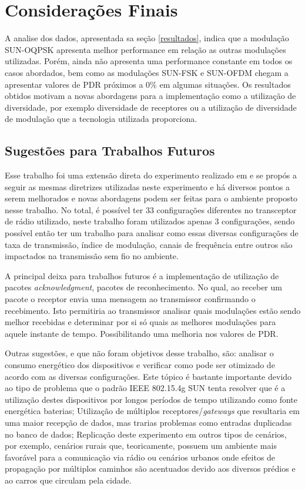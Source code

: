 \chapter{Considerações Finais}
\label{cap:conclusao}
A analise dos dados, apresentada sa seção \ref{resultados}, indica que a modulação SUN-OQPSK apresenta melhor performance em relação as outras modulações utilizadas. Porém, ainda não apresenta uma performance constante em todos os casos abordados, bem como as modulações SUN-FSK e SUN-OFDM chegam a apresentar valores de PDR próximos a 0\% em algumas situações. Os resultados obtidos motivam a novas abordagens para a implementação como a utilização de diversidade, por exemplo diversidade de receptores ou a utilização de diversidade de modulação que a tecnologia utilizada proporciona.


\section{Sugestões para Trabalhos Futuros}
\label{sec:futuros}
Esse trabalho foi uma extensão direta do experimento realizado em \cite{tuset2020dataset} e se propós a seguir as mesmas diretrizes utilizadas neste experimento e há diversos pontos a serem melhorados e novas abordagens podem ser feitas para o ambiente proposto nesse trabalho. No total, é possível ter 33 configurações diferentes no transceptor de rádio utilizado, neste trabalho foram utilizados apenas 3 configurações, sendo possível então ter um trabalho para analisar como essas diversas configurações de taxa de transmissão, índice de modulação, canais de frequência entre outros são impactados na transmissão sem fio no ambiente.

A principal deixa para trabalhos futuros é a implementação de utilização de pacotes \emph{acknowledgment}, pacotes de reconhecimento. No qual, ao receber um pacote o receptor envia uma mensagem ao transmissor confirmando o recebimento. Isto permitiria ao transmissor analisar quais modulações estão sendo melhor recebidas e determinar por si só quais as melhores modulações para aquele instante de tempo. Possibilitando uma melhoria nos valores de PDR.

Outras sugestões, e que não foram objetivos desse trabalho, são: analisar o consumo energético dos dispositivos e verificar como pode ser otimizado de acordo com as diversas configurações. Este tópico é bastante importante devido ao tipo de problema que o padrão IEEE 802.15.4g SUN tenta resolver que é a utilização destes dispositivos por longos períodos de tempo utilizando como fonte energética baterias; Utilização de múltiplos receptores/\emph{gateways} que resultaria em uma maior recepção de dados, mas trarias problemas como entradas duplicadas no banco de dados; Replicação deste experimento em outros tipos de cenários, por exemplo, cenários rurais que, teoricamente, possuem um ambiente mais favorável para a comunicação via rádio ou cenários urbanos onde efeitos de propagação por múltiplos caminhos são acentuados devido aos diversos prédios e ao carros que circulam pela cidade.
